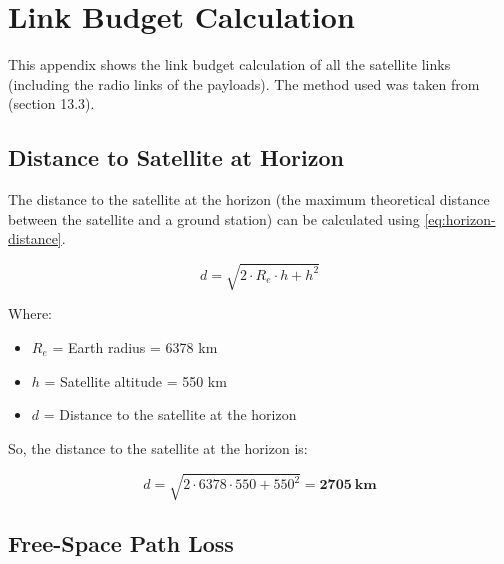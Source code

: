 %
%
%
%
%

%
%
%
%
%
%

\chapter{Link Budget Calculation} \label{anx:link-budget}

This appendix shows the link budget calculation of all the satellite links (including the radio links of the payloads). The method used was taken from \cite{larson2005} (section 13.3).

\section{Distance to Satellite at Horizon}

The distance to the satellite at the horizon (the maximum theoretical distance between the satellite and a ground station) can be calculated using \autoref{eq:horizon-distance}.

\begin{equation} \label{eq:horizon-distance}
d = \sqrt{2\cdot R_{e}\cdot h + h^{2}}
\end{equation}

Where:

\begin{itemize}
    \item $R_{e}$ = Earth radius = 6378 km
    \item $h$ = Satellite altitude = 550 km
    \item $d$ = Distance to the satellite at the horizon
\end{itemize}

So, the distance to the satellite at the horizon is:

\begin{equation} \label{eq:horizon-distance-result}
d = \sqrt{2\cdot 6378\cdot 550 + 550^{2}} = \mathbf{2705\ km}
\end{equation}

\section{Free-Space Path Loss}

